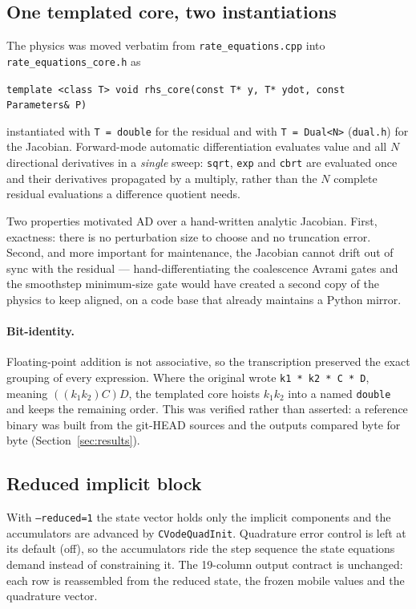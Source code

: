 \documentclass[11pt,a4paper]{article}
\newcommand{\code}[1]{\texttt{\small #1}}
\begin{document}
\subsection{One templated core, two instantiations}

The physics was moved verbatim from \code{rate\_equations.cpp} into
\code{rate\_equations\_core.h} as
\begin{center}
\code{template <class T> void rhs\_core(const T* y, T* ydot, const Parameters\& P)}
\end{center}
instantiated with \code{T = double} for the residual and with
\code{T = Dual<N>} (\code{dual.h}) for the Jacobian. Forward-mode automatic
differentiation evaluates value and all $N$ directional derivatives in a
\emph{single} sweep: \code{sqrt}, \code{exp} and \code{cbrt} are evaluated once
and their derivatives propagated by a multiply, rather than the $N$ complete
residual evaluations a difference quotient needs.

Two properties motivated AD over a hand-written analytic Jacobian. First,
exactness: there is no perturbation size to choose and no truncation error.
Second, and more important for maintenance, the Jacobian cannot drift out of
sync with the residual --- hand-differentiating the coalescence Avrami gates and
the smoothstep minimum-size gate would have created a second copy of the physics
to keep aligned, on a code base that already maintains a Python mirror.

\paragraph{Bit-identity.} Floating-point addition is not associative, so the
transcription preserved the exact grouping of every expression. Where the
original wrote \code{k1 * k2 * C * D}, meaning $((k_1k_2)C)D$, the templated
core hoists $k_1k_2$ into a named \code{double} and keeps the remaining order.
This was verified rather than asserted: a reference binary was built from the
git-HEAD sources and the outputs compared byte for byte
(Section~\ref{sec:results}).

\subsection{Reduced implicit block}

With \code{--reduced=1} the state vector holds only the implicit components and
the accumulators are advanced by \code{CVodeQuadInit}. Quadrature error control
is left at its default (off), so the accumulators ride the step sequence the
state equations demand instead of constraining it. The 19-column output
contract is unchanged: each row is reassembled from the reduced state, the
frozen mobile values and the quadrature vector.
\end{document}
